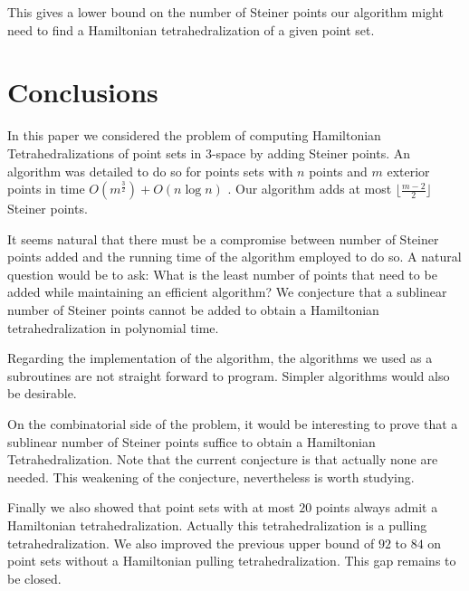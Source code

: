 \documentclass{article}
\begin{document}
 This gives a lower bound on the number of Steiner points our algorithm might need to find a Hamiltonian tetrahedralization of a given point set.

\section{Conclusions}\label{section:conclusions}

In this paper we considered the problem of computing Hamiltonian Tetrahedralizations
of point sets in $3$-space by adding Steiner points. An algorithm was detailed to do so
for points sets with $n$ points and $m$ exterior points in time  $O(m^\frac{3}{2}) +  O(n \log n)$ .
Our algorithm adds at most $\lfloor \frac{m-2}{2}\rfloor$  Steiner points.\par

It seems natural that there must be a compromise between number of Steiner points added and
the running time of the algorithm employed to do so. A natural question would be to ask:
What is the least number of points that need to be added while maintaining an
efficient algorithm? We conjecture that a sublinear number
of Steiner points cannot be added to obtain a Hamiltonian
tetrahedralization in polynomial time.\par

Regarding the implementation of the algorithm, the algorithms we used
as a subroutines are not straight forward to program. Simpler algorithms
would also be desirable.\par

On the combinatorial side of the problem, it would be interesting to prove
that a sublinear number of Steiner points suffice to obtain a Hamiltonian
Tetrahedralization. Note that the current conjecture is that actually
none are needed. This weakening of the conjecture, nevertheless is worth
studying.\par

Finally we also showed that point sets with at most $20$ points always admit
a Hamiltonian tetrahedralization. Actually this tetrahedralization is a pulling 
tetrahedralization. We also improved the previous upper bound of $92$ to
$84$ on point sets without a Hamiltonian pulling tetrahedralization.
This gap remains to be closed.






\end{document}
